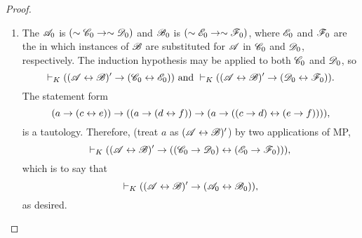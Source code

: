 \begin{proposition}
\begin{proof}
\begin{enumerate}
      \item The \wf{} \(\mathscr{A}_0\) is \((\sim\mathscr{C}_0 \rightarrow \sim\mathscr{D}_0)\) and \(\mathscr{B}_0\) is \((\sim\mathscr{E}_0 \rightarrow \sim\mathscr{F}_0)\), where \(\mathscr{E}_0\) and \(\mathscr{F}_0\) are the \wfs{} in which instances of \(\mathscr{B}\) are substituted for \(\mathscr{A}\) in \(\mathscr{C}_0\) and \(\mathscr{D}_0\), respectively. The induction hypothesis may be applied to both \(\mathscr{C}_0\) and \(\mathscr{D}_0\), so
          \[\vdash_{K} ((\mathscr{A} \leftrightarrow \mathscr{B})' \rightarrow (\mathscr{C}_0 \leftrightarrow \mathscr{E}_0)) \text{ and } \vdash_{K} ((\mathscr{A} \leftrightarrow \mathscr{B})' \rightarrow (\mathscr{D}_0 \leftrightarrow \mathscr{F}_0)).\]
        The statement form
          \[(a \rightarrow (c \leftrightarrow e)) \rightarrow ((a \rightarrow (d \leftrightarrow f)) \rightarrow (a \rightarrow ((c \rightarrow d) \leftrightarrow (e \rightarrow f)))),\]
        is a tautology. Therefore, (treat \(a\) as \((\mathscr{A} \leftrightarrow \mathscr{B})'\)) by two applications of MP,
          \[\vdash_{K} ((\mathscr{A} \leftrightarrow \mathscr{B})' \rightarrow ((\mathscr{C}_0 \rightarrow \mathscr{D}_0) \leftrightarrow (\mathscr{E}_0 \rightarrow \mathscr{F}_0))),\]
        which is to say that
          \[\vdash_{K} ((\mathscr{A} \leftrightarrow \mathscr{B})' \rightarrow (\mathscr{A}_0 \leftrightarrow \mathscr{B}_0)),\]
        as desired.


\end{enumerate}
\end{proof}
\end{proposition}
